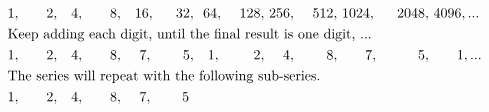 \begin{alignat*}{15}
&1,&\quad2,&\quad4,&\quad8,&~~~16,&~~32,&~~64,&~128,&~256,&~512,&~1024,&~2048,&~4096, ...\\
\rlap{\text{Keep adding each digit, until the final result is one digit, ...}}\\
&1,&\quad2,&\quad4,&\quad8,&\quad~7,&\quad5,&\quad1,&\quad~2,&\quad~4,&\quad~8,&\quad~~~7,&\quad~~~5,&\quad~~~1, ...\\
\rlap{\text{The series will repeat with the following sub-series.}}\\
&1,&\quad2,&\quad4,&\quad8,&\quad~7,&\quad5~
\end{alignat*}
